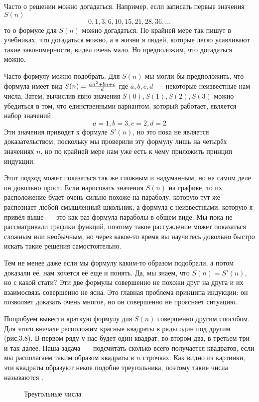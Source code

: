 Часто о решении можно догадаться. Например, если записать первые значения $S(n)$
$$0, 1, 3, 6, 10, 15, 21, 28, 36, \ldots$$
то о формуле для $S(n)$ можно догадаться. По крайней мере так пишут в учебниках, что догадаться можно, а в жизни я людей, которые легко улавливают такие закономерности, видел очень мало. Но предположим, что догадаться можно.

Часто формулу можно подобрать. Для $S(n)$ мы могли бы предположить, что формула имеет вид
$S(n) = {an^2 + bn + c\over d}$
где $a, b, c, d$~--- некоторые неизвестные нам числа. Затем, вычислив явно значения $S(0), S(1), S(2), S(3)$ можно убедиться в том, что единственными вариантом, который работает, является набор значений
$$a=1, b=3, c=2, d=2$$
Эти значения приводят к формуле $S'(n)$, но это пока не является доказательством, поскольку мы проверили эту формулу лишь на четырёх значениях $n$, но по крайней мере нам уже есть к чему приложить принцип индукции.

Этот подход может показаться так же сложным и надуманным, но на самом деле он довольно прост. Если нарисовать значения $S(n)$ на графике, то их расположение будет очень сильно похоже на параболу, которую тут же распознает любой смышленный школьник, а формула с неизвестными, которую я привёл выше~--- это как раз формула параболы в общем виде. Мы пока не рассматривали графики функций, поэтому такое рассуждение может показаться сложным или необычным, но через какое-то время вы научитесь довольно быстро искать такие решения самостоятельно.

Тем не менее даже если мы формулу каким-то образом подобрали, а потом доказали её, нам хочется её еще и понять. Да, мы знаем, что $S(n)=S'(n)$, но с какой стати? Эти две формулы совершенно не похожи друг на друга и их взаимосвязь совершенно не ясна. Это главная проблема принципа индукции: он позволяет доказать очень многое, но он совершенно не проясняет ситуацию.

Попробуем вывести краткую формулу для $S(n)$ совершенно другим способом. Для этого вначале расположим красные квадраты в ряды один под другим (рис.3.8). В первом ряду у нас будет один квадрат, во втором два, в третьем три и так далее. Наша задача~--- подсчитать сколько всего получается квадратов, если мы располагаем таким образом квадраты в $n$ строчках. Как видно из картинки, эти квадраты образуют некое подобие треугольника, поэтому такие числа называются .

\begin{figure}[h]
\centering
{}
\caption{Треугольные числа}
\end{figure}


